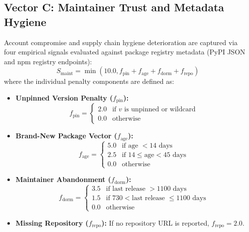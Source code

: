 \subsection{Vector C: Maintainer Trust and Metadata Hygiene}
\label{sec:method_maint}
Account compromise and supply chain hygiene deterioration are captured via four empirical signals evaluated against package registry metadata (PyPI JSON and npm registry endpoints):
\begin{equation}
S_{\text{maint}} = \min\left(10.0, f_{\text{pin}} + f_{\text{age}} + f_{\text{dorm}} + f_{\text{repo}}\right)
\end{equation}
where the individual penalty components are defined as:
\begin{itemize}
    \item \textbf{Unpinned Version Penalty ($f_{\text{pin}}$):}
    \begin{equation}
    f_{\text{pin}} = \begin{cases} 2.0 & \text{if } v \text{ is unpinned or wildcard} \\ 0.0 & \text{otherwise} \end{cases}
    \end{equation}
    \item \textbf{Brand-New Package Vector ($f_{\text{age}}$):}
    \begin{equation}
    f_{\text{age}} = \begin{cases} 5.0 & \text{if age } < 14 \text{ days} \\ 2.5 & \text{if } 14 \le \text{age} < 45 \text{ days} \\ 0.0 & \text{otherwise} \end{cases}
    \end{equation}
    \item \textbf{Maintainer Abandonment ($f_{\text{dorm}}$):}
    \begin{equation}
    f_{\text{dorm}} = \begin{cases} 3.5 & \text{if last release } > 1100 \text{ days} \\ 1.5 & \text{if } 730 < \text{last release } \le 1100 \text{ days} \\ 0.0 & \text{otherwise} \end{cases}
    \end{equation}
    \item \textbf{Missing Repository ($f_{\text{repo}}$):} If no repository URL is reported, $f_{\text{repo}} = 2.0$.
\end{itemize}

